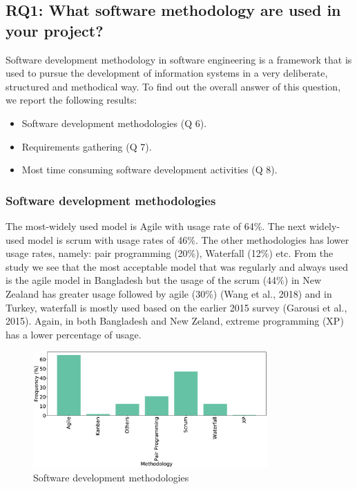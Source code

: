 \subsection{RQ1: What software methodology are used in your project?}
\label{RQ1}
Software development methodology in software engineering is a framework that is used to pursue the development of information systems in a very deliberate, structured and methodical way. To find out the overall answer of this question, we report the following results:
\begin{itemize}
\item Software development methodologies (Q 6).
\item Requirements gathering (Q 7).
\item Most time consuming software development activities (Q 8).
\end{itemize}

\subsubsection{Software development methodologies}
The most-widely used model is Agile with usage rate of 64\%. The next widely-used model is scrum with usage rates of 46\%. The other methodologies has lower usage rates, namely: pair programming (20\%), Waterfall (12\%) etc. From the study we see that the most acceptable model that was regularly and always used is the agile model in Bangladesh but the usage of the scrum (44\%) in New Zealand has greater usage followed by agile (30\%) (Wang et al., 2018) and in Turkey, waterfall is mostly used based on the earlier 2015 survey (Garousi et al., 2015). Again, in both Bangladesh and New Zeland, extreme programming (XP) has a lower percentage of usage.
\begin{figure}[htbp]
\centering
  \includegraphics[width=0.8\textwidth]{Figures/Respondents_Methodology}
  \caption{Software development methodologies}
  \label{fig:methodologies}
\end{figure}

